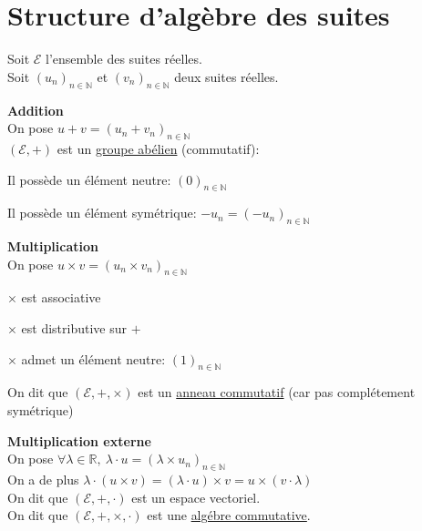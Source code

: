 \documentclass[12pt,twoside,a4paper]{article}
\author{MPSI 2}
\begin{document}
	\maketitle
	\section{Structure d'alg\`ebre des suites}
		\begin{flushleft}
			Soit $\mathcal{E}$ l'ensemble des suites r\'eelles.\\
			Soit $(u_n)_{n\in\mathbb{N}}$ et $(v_n)_{n\in\mathbb{N}}$ deux suites r\'eelles.\\
		\end{flushleft}
		\begin{flushleft}
			\textbf{Addition}\\
			On pose $u+v=(u_n+v_n)_{n\in\mathbb{N}}$\\
			$(\mathcal{E},+)$ est un \underline{groupe ab\'elien} (commutatif):
			\begin{liste}
				\item Il poss\`ede un \'el\'ement neutre: $(0)_{n\in\mathbb{N}}$
				\item Il poss\`ede un \'el\'ement sym\'etrique: $-u_n=(-u_n)_{n\in\mathbb{N}}$
			\end{liste}
		\end{flushleft}
		\begin{flushleft}
			\textbf{Multiplication}\\
			On pose $u\times v=(u_n\times v_n)_{n\in\mathbb{N}}$\\
			\begin{liste}
				\item[$\times$] est associative
				\item[$\times$] est distributive sur $+$
				\item[$\times$] admet un \'el\'ement neutre: $(1)_{n\in\mathbb{N}}$
			\end{liste}
			On dit que $(\mathcal{E},+,\times)$ est un \underline{anneau commutatif} (car pas compl\'etement sym\'etrique)
		\end{flushleft}
		\begin{flushleft}
			\textbf{Multiplication externe}\\
			On pose $\forall\lambda\in\mathbb{R},\ \lambda\cdot u=(\lambda\times u_n)_{n\in\mathbb{N}}$\\
			On a de plus $\lambda\cdot(u\times v)=(\lambda\cdot u)\times v=u\times(v\cdot\lambda)$\\
			On dit que $(\mathcal{E},+,\cdot)$ est un espace vectoriel.\\
			On dit que $(\mathcal{E},+,\times,\cdot)$ est une \underline{alg\'ebre commutative}.
		\end{flushleft}
\end{document}
